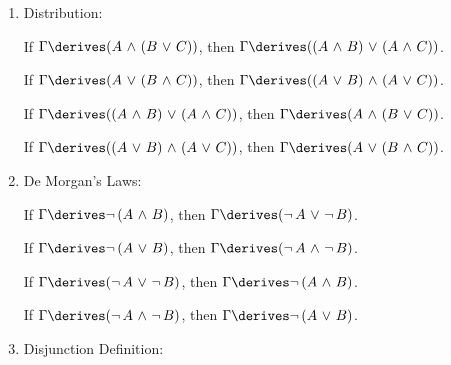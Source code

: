 \begin{enumerate}[topsep=2pt,itemsep=10pt,label=\textup{\texttt{(\arabic*)}}]
    \item Distribution:  \label{rule-of-inference:distribution}

        If \( \Gamma \derives \mleft( A \,\,{\land}\,\, \mleft( B \,\,{\lor}\,\, C \mright) \mright) \), then
        \( \Gamma \derives \mleft( \mleft( A \,\,{\land}\,\, B \mright) \,\,{\lor}\,\, \mleft( A \,\,{\land}\,\, C \mright) \mright) \).

        \noindent
        If \( \Gamma \derives \mleft( A \,\,{\lor}\,\, \mleft( B \,\,{\land}\,\, C \mright) \mright) \), then
        \( \Gamma \derives \mleft( \mleft( A \,\,{\lor}\,\, B \mright) \,\,{\land}\,\, \mleft( A \,\,{\lor}\,\, C \mright) \mright) \).

        \noindent
        If \( \Gamma \derives \mleft( \mleft( A \,\,{\land}\,\, B \mright) \,\,{\lor}\,\, \mleft( A \,\,{\land}\,\, C \mright) \mright) \),
        then \( \Gamma \derives \mleft( A \,\,{\land}\,\, \mleft( B \,\,{\lor}\,\, C \mright) \mright) \).

        \noindent
        If \( \Gamma \derives \mleft( \mleft( A \,\,{\lor}\,\, B \mright) \,\,{\land}\,\, \mleft( A \,\,{\lor}\,\, C \mright) \mright) \),
        then \( \Gamma \derives \mleft( A \,\,{\lor}\,\, \mleft( B \,\,{\land}\,\, C \mright) \mright) \).

    \item De Morgan's Laws:  \label{rule-of-inference:de-morgans-laws}

        If \( \Gamma \derives \lnot \, \mleft( A \,\,{\land}\,\, B \mright) \), then
        \( \Gamma \derives \mleft( \lnot \, A \,\,{\lor}\,\, \lnot \, B \mright) \).

        \noindent
        If \( \Gamma \derives \lnot \, \mleft( A \,\,{\lor}\,\, B \mright) \), then
        \( \Gamma \derives \mleft( \lnot \, A \,\,{\land}\,\, \lnot \, B \mright) \).

        \noindent
        If \( \Gamma \derives \mleft( \lnot \, A \,\,{\lor}\,\, \lnot \, B \mright) \), then
        \( \Gamma \derives \lnot \, \mleft( A \,\,{\land}\,\, B \mright) \).

        \noindent
        If \( \Gamma \derives \mleft( \lnot \, A \,\,{\land}\,\, \lnot \, B \mright) \), then
        \( \Gamma \derives \lnot \, \mleft( A \,\,{\lor}\,\, B \mright) \).

    \item Disjunction Definition:  \label{rule-of-inference:disjunction-definition}


\end{enumerate}
